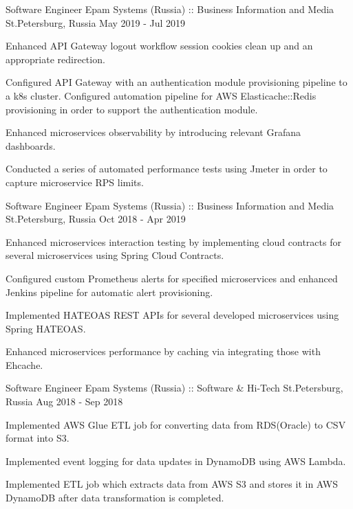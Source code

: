 \begin{cventries}
\cventry
{Software Engineer} %
{Epam Systems (Russia) :: Business Information and Media} %
{St.Petersburg, Russia} %
{May 2019 - Jul 2019} %
{
  \begin{cvitems} %
    \item {Enhanced API Gateway logout workflow session cookies clean up and an appropriate redirection.}
    \item {Configured API Gateway with an authentication module provisioning pipeline to a k8s cluster. 
    Configured automation pipeline for AWS Elasticache::Redis provisioning in order to support the authentication module.}
    \item {Enhanced microservices observability by introducing relevant Grafana dashboards.}
    \item {Conducted a series of automated performance tests using Jmeter in order to capture microservice RPS limits.}
  \end{cvitems}
}

\cventry
{Software Engineer} %
{Epam Systems (Russia) :: Business Information and Media} %
{St.Petersburg, Russia} %
{Oct 2018 - Apr 2019} %
{
  \begin{cvitems} %
    \item {Enhanced microservices interaction testing by implementing cloud contracts for several microservices using Spring Cloud Contracts.}
    \item {Configured custom Prometheus alerts for specified microservices and enhanced Jenkins pipeline for automatic alert provisioning.}
    \item {Implemented HATEOAS  REST APIs for several developed microservices using Spring HATEOAS.}
    \item {Enhanced microservices performance by caching via integrating those with Ehcache.}
  \end{cvitems}
}

\cventry
{Software Engineer} %
{Epam Systems (Russia) :: Software \& Hi-Tech} %
{St.Petersburg, Russia} %
{Aug 2018 - Sep 2018} %
{
  \begin{cvitems} %
    \item {Implemented AWS Glue ETL job for converting data from RDS(Oracle) to CSV format into S3.}
    \item {Implemented event logging for data updates in DynamoDB using AWS Lambda.}
    \item {Implemented ETL job which extracts data from AWS S3 and stores it in AWS DynamoDB after data transformation is completed.}
  \end{cvitems}
}


\end{cventries}
